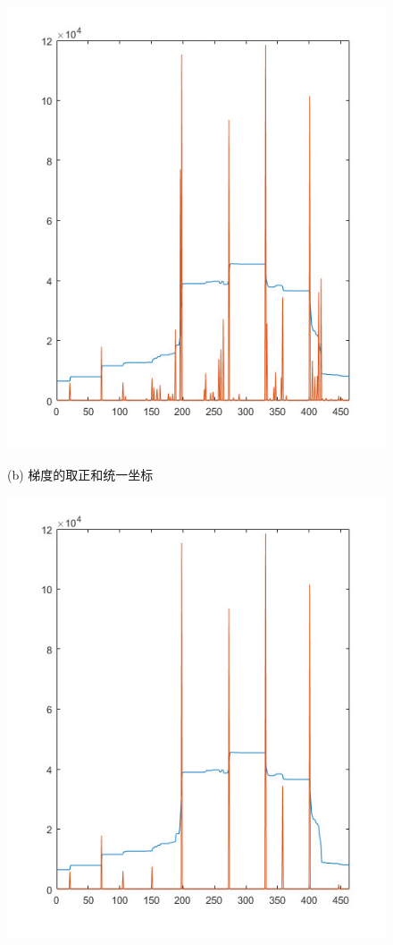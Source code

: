 \begin{figure}[!h]
\begin{minipage}[t]{0.32\linewidth}
        \includegraphics[width=\textwidth]{./figures/c4_unified.jpg}
        \centerline{\small (b) 梯度的取正和统一坐标}
        \end{minipage}
        \begin{minipage}[t]{0.32\linewidth}
        \centering
        \includegraphics[width=\textwidth]{./figures/c4_nms.jpg}

\end{minipage}
\end{figure}
